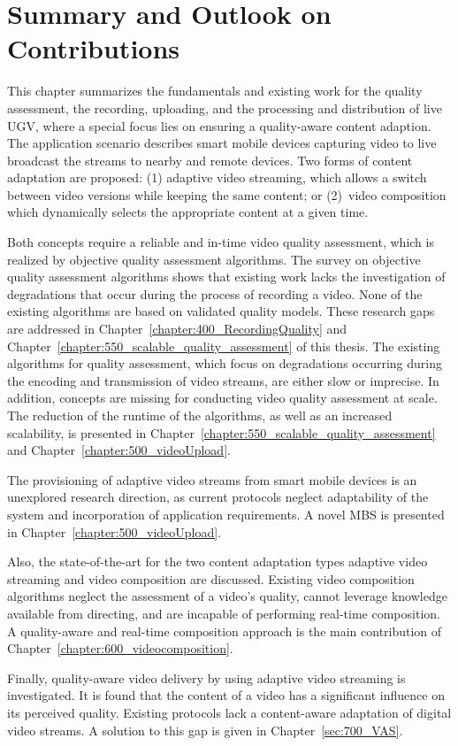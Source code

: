 \section{Summary and Outlook on Contributions}
This chapter summarizes the fundamentals and existing work for the quality assessment, the recording, uploading, and the processing and distribution of live \ac{UGV}, where a special focus lies on ensuring a quality-aware content adaption. %
The application scenario describes smart mobile devices capturing video to live broadcast the streams to nearby and remote devices. 
Two forms of content adaptation are proposed: (1) adaptive video streaming, which allows a switch between video versions while keeping the same content; or
(2)~video composition which dynamically selects the appropriate content at a given time.

Both concepts require a reliable and in-time video quality assessment, which is realized by objective quality assessment algorithms.
The survey on objective quality assessment algorithms shows that existing work lacks the investigation of degradations that occur during the process of recording a video.
None of the existing algorithms are based on validated quality models.
These research gaps are addressed in Chapter~\ref{chapter:400_RecordingQuality} and Chapter~\ref{chapter:550_scalable_quality_assessment} of this thesis.
The existing algorithms for quality assessment, which focus on degradations occurring during the encoding and transmission of video streams, are either slow or imprecise.
In addition, concepts are missing for conducting video quality assessment at scale.
The reduction of the runtime of the algorithms, as well as an increased scalability, is presented in Chapter~\ref{chapter:550_scalable_quality_assessment} and Chapter~\ref{chapter:500_videoUpload}.

The provisioning of adaptive video streams from smart mobile devices is an unexplored research direction, as current protocols neglect adaptability of the system and incorporation of application requirements.
A novel \ac{MBS} is presented in Chapter~\ref{chapter:500_videoUpload}.

Also, the state-of-the-art for the two content adaptation types adaptive video streaming and video composition are discussed.
Existing video composition algorithms neglect the assessment of a video's quality, cannot leverage knowledge available from directing, and are incapable of performing real-time composition.
A quality-aware and real-time composition approach is the main contribution of Chapter~\ref{chapter:600_videocomposition}.

Finally, quality-aware video delivery by using adaptive video streaming is investigated.
It is found that the content of a video has a significant influence on its perceived quality.
Existing protocols lack a content-aware adaptation of digital video streams.
A solution to this gap is given in Chapter~\ref{sec:700_VAS}.
